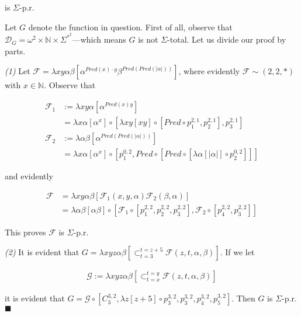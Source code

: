 \documentclass[a4paper, 12pt]{article}
\begin{document}
is $\Sigma$-p.r.

Let $G$ denote the function in question. First of all, observe that
$\mathcal{D}_G = \omega^2  \times \mathbb{N} \times \Sigma^{*}^2$---which means
$G$ is not $\Sigma$-total. Let us divide our proof by parts. 

\textit{(1)} Let $\mathcal{F} = \lambda xy \alpha \beta \left[ \alpha^{Pred(x)
\cdot y} \beta^{Pred(Pred(|\alpha|))} \right] $, where evidently $\mathcal{F}
\sim (2, 2, *)$ with $x \in \mathbb{N}$. Observe that 

\begin{align*}
    \mathcal{F}_1 &:= \lambda
    xy \alpha \left[ \alpha^{Pred(x)y} \right]\\ &= \lambda x\alpha \left[ \alpha^{x}
    \right] \circ \left[ \lambda xy\left[ xy \right] \circ \left[Pred \circ
    p_{1}^{2, 1}, p_{2}^{2, 1}\right], p_3^{2, 1} \right]   \\ 
    \mathcal{F}_2 &:= \lambda \alpha \beta \left[ \alpha^{Pred(Pred(|\alpha|))}
        \right] \\&= \lambda x\alpha[\alpha^x] \circ \left[ p_1^{0, 2}, Pred \circ
    \left[ Pred \circ \left[ \lambda \alpha [|\alpha|] \circ p_2^{0, 2} \right]  \right]  \right] 
\end{align*}

and evidently 

\begin{align*}
    \mathcal{F} &= \lambda xy\alpha\beta [\mathcal{F}_1(x, y, \alpha)
    \mathcal{F}_2(\beta, \alpha)]\\ &= \lambda \alpha\beta [\alpha\beta] \circ \left[
\mathcal{F}_1 \circ \left[ p_1^{2, 2}, p_2^{2, 2}, p_3^{2, 2} \right],
\mathcal{F}_2 \circ \left[ p_4^{2, 2}, p_3^{2, 2} \right]   \right]
\end{align*}

This proves $\mathcal{F}$ is $\Sigma$-p.r. 

\textit{(2)} It is evident that $G = \lambda xyz \alpha \beta
\left[\mathop{\subset}_{t=3}^{t=z+5} \mathcal{F}(z,
t, \alpha, \beta )\right]$. If we let 

\begin{align*}
    \mathcal{G} := \lambda xyz \alpha\beta \left[ \mathop{\subset}_{t=x}^{t=y}
    \mathcal{F} (z, t, \alpha, \beta)\right] 
\end{align*}

it is evident that $G = \mathcal{G} \circ \left[ C_{3}^{3, 2}, \lambda z [z + 5]
    \circ p_3^{3, 2},
p_3^{3, 2}, p_4^{3, 2}, p_5^{3, 2} \right] $. Then $G$ is $\Sigma$-p.r. $\blacksquare$
\end{document}
